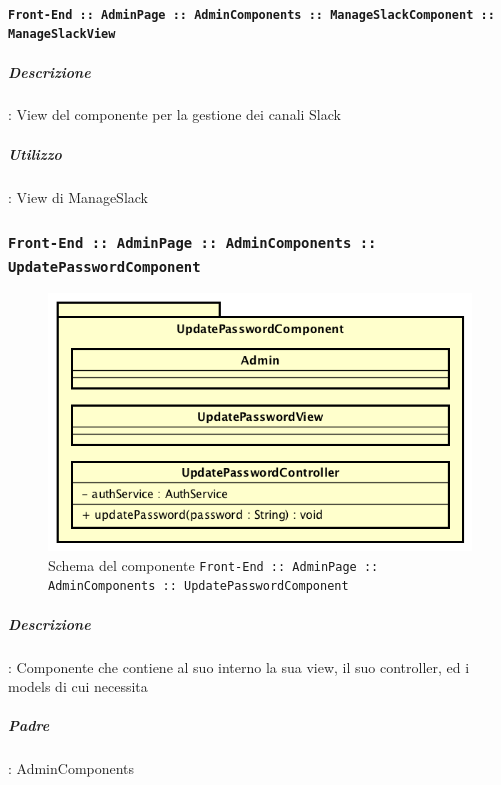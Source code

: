 \documentclass[../DefinizioneDiProdotto_v2.0.0.tex]{subfiles}
\begin{document}
		      	\paragraph{\texttt{Front-End :: AdminPage :: AdminComponents :: ManageSlackComponent :: ManageSlackView}}
					\subparagraph{Descrizione}: View del componente per la gestione dei canali Slack
					\subparagraph{Utilizzo}: View di ManageSlack

	\newpage
	\subsubsection{\texttt{Front-End :: AdminPage :: AdminComponents :: UpdatePasswordComponent}}
	\begin{figure}[!h]
		\centering
		\includegraphics[scale=0.6]{Architettura/Front-End/AdminPage/AdminComponents/UpdatePasswordComponent.png}
		\caption{Schema del componente \texttt{Front-End :: AdminPage :: AdminComponents :: UpdatePasswordComponent}}
	\end{figure}

			\subparagraph{Descrizione}: Componente che contiene al suo interno la sua view, il suo controller, ed i models di cui necessita
			\subparagraph{Padre}: AdminComponents
\end{document}
